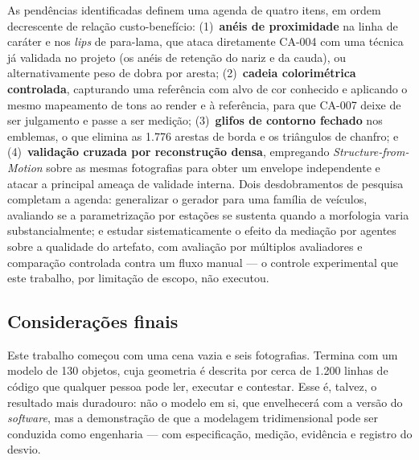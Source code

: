 As pend\^encias identificadas definem uma agenda de quatro itens, em ordem decrescente de
rela\c{c}\~ao custo-benef\'icio: (1)~\textbf{an\'eis de proximidade} na linha de
car\'ater e nos \emph{lips} de para-lama, que ataca diretamente CA-004 com uma t\'ecnica
j\'a validada no projeto (os an\'eis de reten\c{c}\~ao do nariz e da cauda), ou
alternativamente peso de dobra por aresta; (2)~\textbf{cadeia colorim\'etrica
controlada}, capturando uma refer\^encia com alvo de cor conhecido e aplicando o mesmo
mapeamento de tons ao render e \`a refer\^encia, para que CA-007 deixe de ser julgamento e
passe a ser medi\c{c}\~ao; (3)~\textbf{glifos de contorno fechado} nos emblemas, o que
elimina as 1.776 arestas de borda e os tri\^angulos de chanfro; e (4)~\textbf{valida\c{c}\~ao
cruzada por reconstru\c{c}\~ao densa}, empregando \emph{Structure-from-Motion} sobre as
mesmas fotografias para obter um envelope independente e atacar a principal amea\c{c}a de
validade interna. Dois desdobramentos de pesquisa completam a agenda: generalizar o gerador
para uma fam\'ilia de ve\'iculos, avaliando se a parametriza\c{c}\~ao por
esta\c{c}\~oes se sustenta quando a morfologia varia substancialmente; e estudar
sistematicamente o efeito da media\c{c}\~ao por agentes sobre a qualidade do artefato, com
avalia\c{c}\~ao por m\'ultiplos avaliadores e compara\c{c}\~ao controlada contra um fluxo
manual --- o controle experimental que este trabalho, por limita\c{c}\~ao de escopo,
n\~ao executou.

\subsection{Considera\c{c}\~oes finais}

Este trabalho come\c{c}ou com uma cena vazia e seis fotografias. Termina com um modelo de
130 objetos, cuja geometria \'e descrita por cerca de 1.200 linhas de c\'odigo que qualquer
pessoa pode ler, executar e contestar. Esse \'e, talvez, o resultado mais duradouro: n\~ao
o modelo em si, que envelhecer\'a com a vers\~ao do \emph{software}, mas a
demonstra\c{c}\~ao de que a modelagem tridimensional pode ser conduzida como
engenharia --- com especifica\c{c}\~ao, medi\c{c}\~ao, evid\^encia e registro do desvio.
